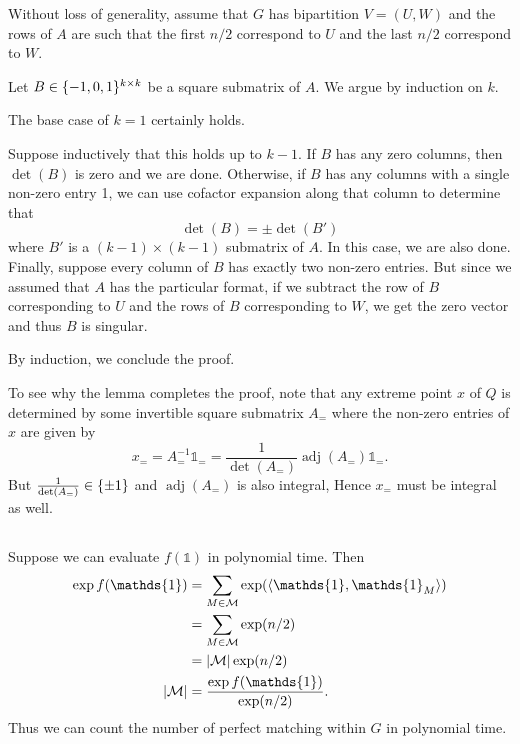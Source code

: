 \documentclass[10pt]{article}
\DeclarePairedDelimiter{\set}{\lbrace}{\rbrace}
\DeclarePairedDelimiter{\iprod}{\langle}{\rangle}
\DeclarePairedDelimiter{\card}{\lvert}{\rvert}
\DeclareMathOperator{\adj}{adj}
\newcommand{\ones}{\mathds{1}}
\newcommand{\mcal}{\mathcal}
\begin{document}
\begin{pf}{}{}
  Without loss of generality,
  assume that $G$ has bipartition $V = (U, W)$
  and the rows of $A$ are such that the first $n/2$ correspond to $U$
  and the last $n/2$ correspond to $W$.

  Let $B\in \set{-1, 0, 1}^{k\times k}$ be a square submatrix of $A$.
  We argue by induction on $k$.

  The base case of $k=1$ certainly holds.

  Suppose inductively that this holds up to $k-1$.
  If $B$ has any zero columns,
  then $\det(B)$ is zero and we are done.
  Otherwise,
  if $B$ has any columns with a single non-zero entry 1,
  we can use cofactor expansion along that column to determine that
  \[
    \det(B) = \pm \det(B')
  \]
  where $B'$ is a $(k-1)\times (k-1)$ submatrix of $A$.
  In this case,
  we are also done.
  Finally,
  suppose every column of $B$ has exactly two non-zero entries.
  But since we assumed that $A$ has the particular format,
  if we subtract the row of $B$ corresponding to $U$
  and the rows of $B$ corresponding to $W$,
  we get the zero vector and thus $B$ is singular.

  By induction,
  we conclude the proof.
\end{pf}

To see why the lemma completes the proof,
note that any extreme point $x$ of $Q$ is determined by some invertible square submatrix $A_=$
where the non-zero entries of $x$ are given by
\[
  x_=
  = A_=^{-1} \ones_=
  = \frac1{\det(A_=)} \adj(A_=) \ones_=.
\]
But $\frac1{\det(A_=)}\in \set{\pm 1}$ and $\adj(A_=)$ is also integral,
Hence $x_=$ must be integral as well.

\subsection{}
Suppose we can evaluate $f(\ones)$ in polynomial time.
Then
\begin{align*}
  \exp f(\ones)
  &= \sum_{M\in \mcal M} \exp(\iprod{\ones, \ones_M}) \\
  &= \sum_{M\in \mcal M} \exp(n/2) \\
  &= \card{\mcal M} \exp(n/2) \\
  \card{\mcal M}
  &= \frac{\exp f(\ones)}{\exp(n/2)}.
\end{align*}
Thus we can count the number of perfect matching within $G$ in polynomial time.

\clearpage
\end{document}
